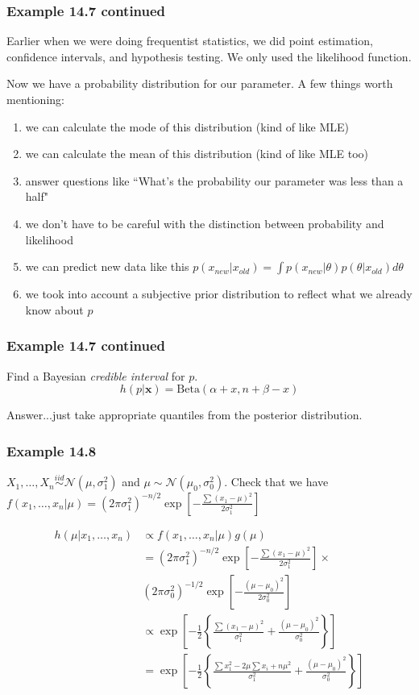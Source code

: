 \documentclass{beamer}
\begin{document}
\begin{frame}
\frametitle{Example 14.7 continued}

Earlier when we were doing frequentist statistics, we did point estimation, confidence intervals, and hypothesis testing. We only used the likelihood function.
\newline

Now we have a probability distribution for our parameter.  A few things worth mentioning:
\begin{enumerate}
\item we can calculate the mode of this distribution (kind of like MLE)
\item we can calculate the mean of this distribution (kind of like MLE too)
\item answer questions like ``What's the probability our parameter was less than a half"
\item we don't have to be careful with the distinction between probability and likelihood
\item we can predict new data like this $p(x_{new}|x_{old}) = \int p(x_{new}|\theta)p(\theta|x_{old}) d \theta$
\item we took into account a subjective prior distribution to reflect what we already know about $p$
\end{enumerate}
\end{frame}
\begin{frame}
\frametitle{Example 14.7 continued}

Find a Bayesian \emph{credible interval} for $p$.
\[
h(p|\mathbf{x}) = \text{Beta}(\alpha + x, n + \beta - x)
\]

Answer...just take appropriate quantiles from the posterior distribution.



\end{frame}
\begin{frame}
\frametitle{Example 14.8}

$X_1, \ldots, X_n \overset{iid}{\sim} \mathcal{N}(\mu, \sigma_1^2)$ and $\mu \sim \mathcal{N}(\mu_0, \sigma_0^2)$. Check that we have $f(x_1, \ldots, x_n | \mu) = (2 \pi \sigma_1^2)^{-n/2} \exp\left[ - \frac{\sum (x_1 - \mu)^2}{2\sigma_1^2} \right]$

\begin{align*}
h(\mu | x_1, \ldots, x_n) &\propto f(x_1, \ldots, x_n | \mu) g(\mu) \\
&= (2 \pi \sigma_1^2)^{-n/2} \exp\left[ - \frac{\sum (x_1 - \mu)^2}{2\sigma_1^2} \right] \times \\
&(2 \pi \sigma_0^2)^{-1/2} \exp\left[-\frac{(\mu - \mu_0)^2}{2 \sigma_0^2} \right] \\
&\propto \exp\left[-\frac{1}{2}\left\{ \frac{\sum (x_1 - \mu)^2}{\sigma_1^2} + \frac{(\mu - \mu_0)^2}{ \sigma_0^2} \right\} \right] \\
&= \exp\left[-\frac{1}{2}\left\{ \frac{\sum x_1^2 - 2\mu \sum x_i + n\mu^2}{\sigma_1^2} + \frac{(\mu - \mu_0)^2}{ \sigma_0^2} \right\} \right]
\end{align*}

\end{frame}
\end{document}
